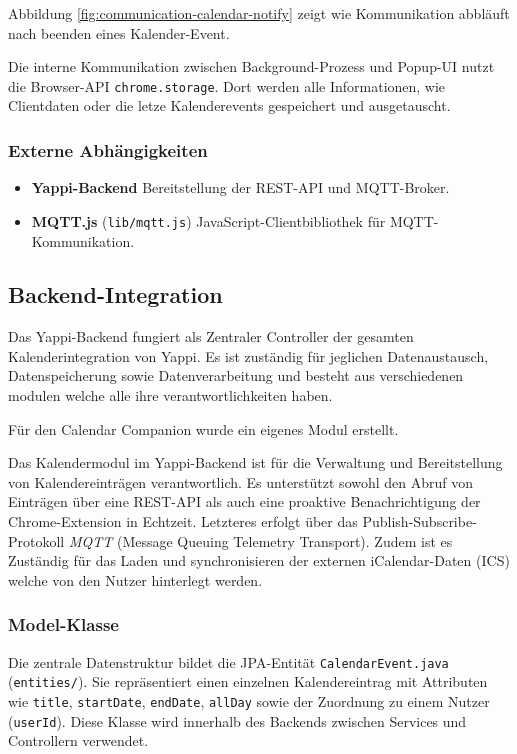 \documentclass[12pt,a4paper]{report}
\begin{document}
        Abbildung \ref{fig:communication-calendar-notify} zeigt wie Kommunikation abbläuft nach beenden eines Kalender-Event.

        Die interne Kommunikation zwischen Background-Prozess und Popup-UI nutzt die Browser-API \texttt{chrome.storage}.
        Dort werden alle Informationen, wie Clientdaten oder die letze Kalenderevents gespeichert und ausgetauscht.



    \subsubsection{Externe Abhängigkeiten}
        \begin{itemize}
          \item \textbf{Yappi-Backend} Bereitstellung der REST-API und MQTT-Broker.
          \item \textbf{MQTT.js} (\texttt{lib/mqtt.js}) JavaScript-Clientbibliothek für MQTT-Kommunikation.
        \end{itemize}

\subsection{Backend-Integration}

        Das Yappi-Backend fungiert als Zentraler Controller der gesamten Kalenderintegration von Yappi.
        Es ist zuständig für jeglichen Datenaustausch, Datenspeicherung sowie Datenverarbeitung und besteht
        aus verschiedenen modulen welche alle ihre verantwortlichkeiten haben.

        Für den Calendar Companion wurde ein eigenes Modul erstellt.

        Das Kalendermodul im Yappi-Backend ist für die Verwaltung und Bereitstellung von Kalendereinträgen verantwortlich.
        Es unterstützt sowohl den Abruf von Einträgen über eine REST-API als auch eine proaktive Benachrichtigung der Chrome-Extension in Echtzeit.
        Letzteres erfolgt über das Publish-Subscribe-Protokoll \textit{MQTT} (Message Queuing Telemetry Transport).
        Zudem ist es Zuständig für das Laden und synchronisieren der externen iCalendar-Daten (ICS) welche von den Nutzer hinterlegt werden.


    \subsubsection{Model-Klasse}
        Die zentrale Datenstruktur bildet die JPA-Entität \texttt{CalendarEvent.java} (\texttt{entities/}).
        Sie repräsentiert einen einzelnen Kalendereintrag mit Attributen wie \texttt{title}, \texttt{startDate}, \texttt{endDate}, \texttt{allDay} sowie der Zuordnung zu einem Nutzer (\texttt{userId}).
        Diese Klasse wird innerhalb des Backends zwischen Services und Controllern verwendet.
\end{document}

